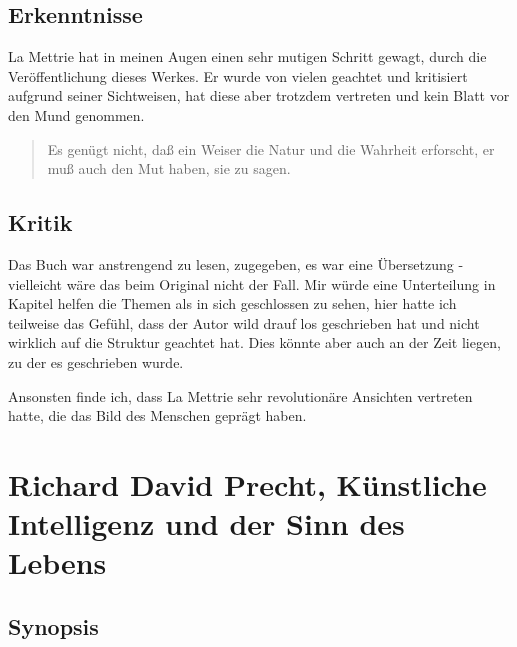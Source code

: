 \documentclass[twoside, a4paper, DIV=11, open=any, bibliography=totoc]{scrbook}
\newcommand{\Quote}[1]{\glqq #1\grqq{}}
\begin{document}
\subsection{Erkenntnisse} \label{sec:literkenntnis2}

La Mettrie hat in meinen Augen einen sehr mutigen Schritt gewagt, durch die Veröffentlichung dieses Werkes. Er wurde von vielen geachtet und kritisiert aufgrund seiner Sichtweisen, hat diese aber trotzdem vertreten und kein Blatt vor den Mund genommen.  

\begin{quote}
    \Quote{Es genügt nicht, daß ein Weiser die Natur und die Wahrheit erforscht, er muß auch den Mut haben, sie zu sagen.}
\end{quote}

\subsection{Kritik} \label{sec:litkritik2}
Das Buch war anstrengend zu lesen, zugegeben, es war eine Übersetzung - vielleicht wäre das beim Original nicht der Fall. Mir würde eine Unterteilung in Kapitel helfen die Themen als in sich geschlossen zu sehen, hier hatte ich teilweise das Gefühl, dass der Autor \Quote{wild drauf los geschrieben hat} und nicht wirklich auf die Struktur geachtet hat. Dies könnte aber auch an der Zeit liegen, zu der es geschrieben wurde.  
\par
Ansonsten finde ich, dass La Mettrie sehr revolutionäre Ansichten vertreten hatte, die das Bild des Menschen geprägt haben. 



\section{Richard David Precht, Künstliche Intelligenz und der Sinn des Lebens} \label{sec:litb3}
\subsection{Synopsis} \label{sec:litsynops3}
\end{document}
